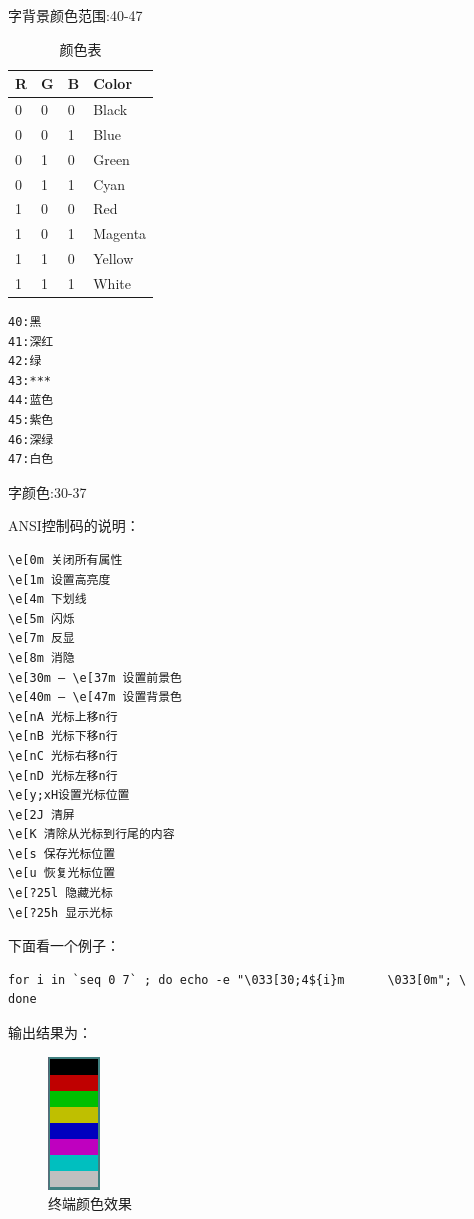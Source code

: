 字背景颜色范围:40-47

\begin{table}[!htbp]
  \centering
  \begin{tabular}{llll}
    \toprule
    R & G & B & Color \\
    \midrule
    0 & 0 & 0 & Black \\
    0 & 0 & 1 & Blue \\
    0 & 1 & 0 & Green \\
    0 & 1 & 1 & Cyan \\
    1 & 0 & 0 & Red \\
    1 & 0 & 1 & Magenta \\
    1 & 1 & 0 & Yellow \\
    1 & 1 & 1 & White \\
    \bottomrule
  \end{tabular}
  \caption{颜色表\cite{computersystem}}
  \label{tab:colorTable}
\end{table}

\begin{verbatim}
40:黑 
41:深红 
42:绿 
43:*** 
44:蓝色 
45:紫色 
46:深绿 
47:白色
\end{verbatim}

字颜色:30-37

ANSI控制码的说明：

\begin{verbatim}
\e[0m 关闭所有属性 
\e[1m 设置高亮度 
\e[4m 下划线 
\e[5m 闪烁 
\e[7m 反显 
\e[8m 消隐 
\e[30m — \e[37m 设置前景色 
\e[40m — \e[47m 设置背景色 
\e[nA 光标上移n行 
\e[nB 光标下移n行 
\e[nC 光标右移n行 
\e[nD 光标左移n行 
\e[y;xH设置光标位置 
\e[2J 清屏 
\e[K 清除从光标到行尾的内容 
\e[s 保存光标位置 
\e[u 恢复光标位置 
\e[?25l 隐藏光标 
\e[?25h 显示光标
\end{verbatim}

下面看一个例子：
\begin{verbatim}
for i in `seq 0 7` ; do echo -e "\033[30;4${i}m      \033[0m"; \ 
done
\end{verbatim}

输出结果为：
\begin{figure}[hbtp]
  \centering
  \includegraphics[width=.15\textwidth]{img/color.png}
  \caption{终端颜色效果}
  \label{fig:TermColor}
\end{figure}

